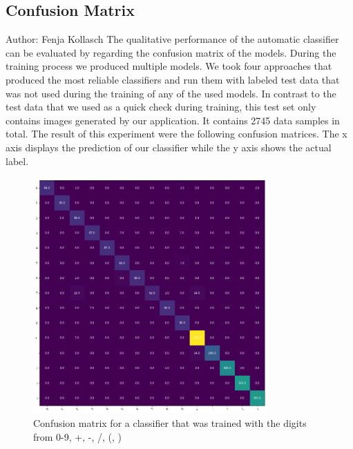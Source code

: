 \documentclass[11pt]{article}
\begin{document}
	
	
	
	
	
	\subsection{Confusion Matrix}
	\small{Author: Fenja Kollasch} \newline \newline
	The qualitative performance of the automatic classifier can be evaluated by regarding the confusion matrix of the models. During the training process we produced multiple models. We took four approaches that produced the most reliable classifiers and run them with labeled test data that was not used during the training of any of the used models. In contrast to the test data that we used as a quick check during training, this test set only contains images generated by our application. It contains 2745 data samples in total. The result of this experiment were the following confusion matrices. The x axis displays the prediction of our classifier while the y axis shows the actual label.
	
	\begin{figure}[H]
		\includegraphics[width=0.8\textwidth]{ImagesForReport/confusion_matrix_all.png}
		\caption{Confusion matrix for a classifier that was trained with the digits from 0-9, +, -, /, (, )}
		\label{fig:mat-all}
	\end{figure}
	
\end{document}
